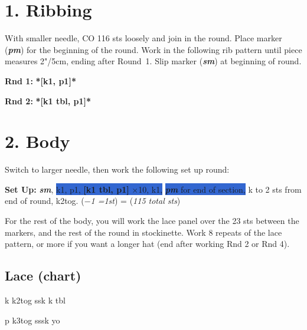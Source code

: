 \documentclass[12pt]{article}
\newcommand{\vocab}[1]{\emph{\textbf{#1}}} %
\newcommand{\rowDir}[1]{\textbf{#1:}} %
\renewcommand{\repeat}[1]{\textbf{*[#1]*}} %
\newcommand{\setrepeat}[1]{\textbf{[#1]}}		%
\newcommand{\x}{$\times$}
\newcommand{\decrease}[1]{(\emph{$-$#1
	\ifnum#1=1{st}\else{sts}\fi})}
\newcommand{\stitchcount}[1]{(\emph{#1 sts})}
\newcommand{\highlighted}[1]{\colorbox{highlight}{#1}}
\renewcommand{\pm}{\vocab{pm}} %
\newcommand{\sm}{\vocab{sm}} %
\begin{document}
\begin{multicols}{2}
\section*{1. Ribbing}

With smaller needle, CO 116 sts loosely and join in the round. Place marker (\pm) for the beginning of the round. Work in the following rib pattern until piece measures 2"/5cm, ending after Round~1. Slip marker (\sm) at beginning of round.

\rowDir{Rnd 1} \repeat{k1, p1} 

\rowDir{Rnd 2} \repeat{k1 tbl, p1}

\section*{2. Body}



Switch to larger needle, then work the following set up round: 

\rowDir{Set Up} \sm, \highlighted{k1, p1, \setrepeat{k1 tbl, p1} \x 10, k1,} \highlighted{ {\pm} for end of section,} k to 2 sts from end of round, k2tog. \decrease{1} = \stitchcount{115 total}

\vspace{1em}
For the rest of the body, you will work the lace panel over the 23 sts between the markers, and the rest of the round in stockinette. Work 8 repeats of the lace pattern, or more if you want a longer hat (end after working Rnd 2 or Rnd 4).

\subsection*{Lace (chart)}


\vspace{1em}
\chart{-} k \hspace{1em}
\chart{>} k2tog \hspace{1em}
\chart{<} ssk \hspace{1em}
 k tbl 

\vspace{.5em}
\chart{=} p \hspace{1em}
 k3tog \hspace{1em}
 sssk \hspace{1em}
 yo



\end{multicols}
\end{document}
